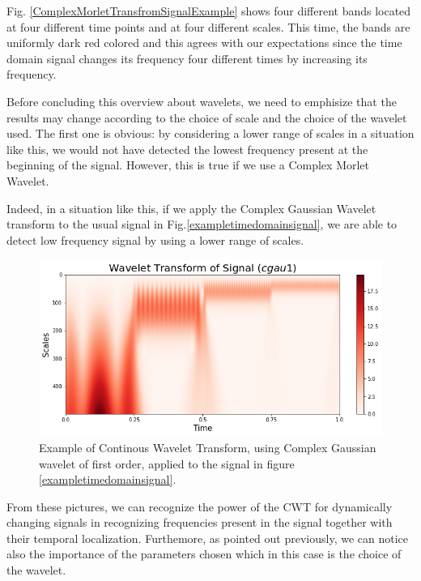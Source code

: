 \documentclass[12pt,a4paper]{report}
\begin{document}
Fig. \ref{ComplexMorletTransfromSignalExample} shows four different bands located at four different time points and at four different scales. This time, the bands are uniformly dark red colored and this agrees with our expectations since the time domain signal changes its frequency four different times by increasing its frequency.

Before concluding this overview about wavelets, we need to emphisize that the results may change according to the choice of scale and the choice of the wavelet used. The first one is obvious: by considering a lower range of scales in a situation like this, we would not have detected the lowest frequency present at the beginning of the signal. However, this is true if we use a Complex Morlet Wavelet. 

Indeed, in a situation like this, if we apply the Complex Gaussian Wavelet transform to the usual signal in Fig.\ref{exampletimedomainsignal}, we are able to detect low frequency signal by using a lower range of scales.

\begin{figure}[!ht]
\includegraphics[scale=0.59]{ComplexGaus1TransformSignalExample.PNG}
\caption{Example of Continous Wavelet Transform, using Complex Gaussian wavelet of first order, applied to the signal in figure \ref{exampletimedomainsignal}.}
\label{ComplexGaus1TransformSignalExample}
\end{figure}
\newpage
From these pictures, we can recognize the power of the CWT for dynamically changing signals in recognizing frequencies present in the signal together with their temporal localization. Furthemore, as pointed out previously, we can notice also the importance of the parameters chosen which in this case is the choice of the wavelet. 

\end{document}
